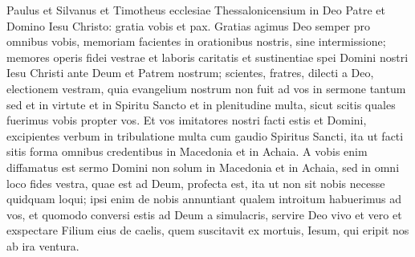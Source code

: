 \begin{biblechapter}
 \verse Paulus et Silvanus et Timotheus ecclesiae Thessalonicensium in Deo Patre et Domino Iesu Christo: gratia vobis et pax.
 \verse Gratias agimus Deo semper pro omnibus vobis, memoriam facientes in orationibus nostris, sine intermissione; 
\verse memores operis fidei vestrae et laboris caritatis et sustinentiae spei Domini nostri Iesu Christi ante Deum et Patrem nostrum; 
\verse scientes, fratres, dilecti a Deo, electionem vestram, 
\verse quia evangelium nostrum non fuit ad vos in sermone tantum sed et in virtute et in Spiritu Sancto et in plenitudine multa, sicut scitis quales fuerimus vobis propter vos.
 \verse Et vos imitatores nostri facti estis et Domini, excipientes verbum in tribulatione multa cum gaudio Spiritus Sancti, 
\verse ita ut facti sitis forma omnibus credentibus in Macedonia et in Achaia. 
\verse A vobis enim diffamatus est sermo Domini non solum in Macedonia et in Achaia, sed in omni loco fides vestra, quae est ad Deum, profecta est, ita ut non sit nobis necesse quidquam loqui; 
 \verse ipsi enim de nobis annuntiant qualem introitum habuerimus ad vos, et quomodo conversi estis ad Deum a simulacris, servire Deo vivo et vero 
\verse et exspectare Filium eius de caelis, quem suscitavit ex mortuis, Iesum, qui eripit nos ab ira ventura.
 

\end{biblechapter}
